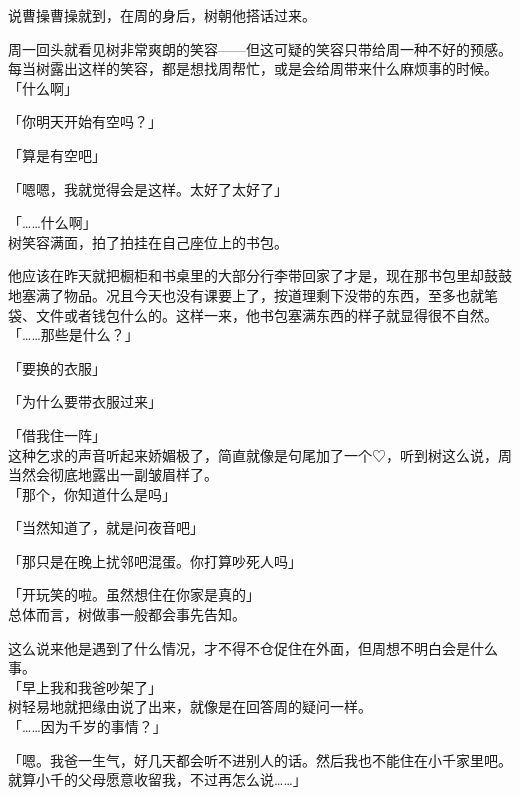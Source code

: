 说曹操曹操就到，在周的身后，树朝他搭话过来。

周一回头就看见树非常爽朗的笑容——但这可疑的笑容只带给周一种不好的预感。每当树露出这样的笑容，都是想找周帮忙，或是会给周带来什么麻烦事的时候。\\

「什么啊」

「你明天开始有空吗？」

「算是有空吧」

「嗯嗯，我就觉得会是这样。太好了太好了」

「……什么啊」\\

树笑容满面，拍了拍挂在自己座位上的书包。

他应该在昨天就把橱柜和书桌里的大部分行李带回家了才是，现在那书包里却鼓鼓地塞满了物品。况且今天也没有课要上了，按道理剩下没带的东西，至多也就笔袋、文件或者钱包什么的。这样一来，他书包塞满东西的样子就显得很不自然。\\

「……那些是什么？」

「要换的衣服」

「为什么要带衣服过来」

「借我住一阵」\\

这种乞求的声音听起来娇媚极了，简直就像是句尾加了一个♡，听到树这么说，周当然会彻底地露出一副皱眉样了。\\

「那个，你知道什么是吗」

「当然知道了，就是问夜音吧」

「那只是在晚上扰邻吧混蛋。你打算吵死人吗」

「开玩笑的啦。虽然想住在你家是真的」\\

总体而言，树做事一般都会事先告知。

这么说来他是遇到了什么情况，才不得不仓促住在外面，但周想不明白会是什么事。\\

「早上我和我爸吵架了」\\

树轻易地就把缘由说了出来，就像是在回答周的疑问一样。\\

「……因为千岁的事情？」

「嗯。我爸一生气，好几天都会听不进别人的话。然后我也不能住在小千家里吧。就算小千的父母愿意收留我，不过再怎么说……」

